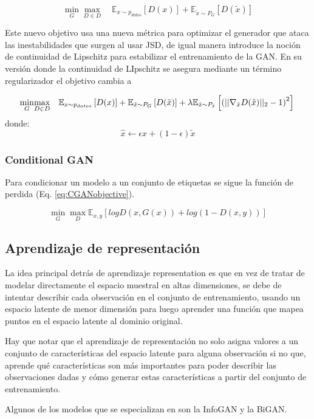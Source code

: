 \begin{equation}
	\label{eq:WGANobjective}
	\underset{G}{\min}\underset{D \in D}{\max}\quad \mathbb{E}_{x \sim  p_{datos}}\left[ D (x) \right] + \mathbb{E}_{\tilde{x}\sim P_{G}}\left[ D(\tilde{x})\right]
\end{equation}

Este nuevo objetivo usa una nueva métrica para optimizar el generador que ataca las inestabilidades que surgen al usar JSD, de igual manera introduce la noción de continuidad de Lipschitz para estabilizar el entrenamiento de la GAN. En su versión donde la continuidad de LIpschitz se asegura mediante un término regularizador el objetivo cambia a

\begin{equation}
	\underset{G}{\min}\underset{D \in D}{\max}\quad \mathbb{E}_{x \sim  p_{datos}}\left[ D (x) \right] + \mathbb{E}_{\tilde{x}\sim P_{G}}\left[ D(\tilde{x})\right] + \lambda \mathbb{E}_{\hat{x}\sim P_{\hat{x}}}\left[ \left( || \nabla_{\hat{x}}D(\hat{x})||_{2} - 1\right) ^2 \right]\\
\end{equation}
\qquad\qquad donde:
\[
	\hat{x} \leftarrow \epsilon x + (1 - \epsilon) \tilde{x}
\]

\subsubsection{Conditional GAN}

Para condicionar un modelo a un conjunto de etiquetas se sigue la función de perdida (Eq. \ref{eq:CGANobjective}).

\begin{equation}
	\label{eq:CGANobjective}
	\underset{G}{\min}\underset{D}{\max} \mathbb{E}_{x,y}\left[ log D (x, G(x)) +  log (1 - D(x,y) ) \right]
\end{equation}

\subsection{Aprendizaje de representación}

La idea principal detrás de aprendizaje representation es que en vez de tratar de modelar directamente el espacio muestral en altas dimensiones, se debe de intentar describir cada observación en el conjunto de entrenamiento,  usando un espacio latente de menor dimensión para luego aprender una función que mapea puntos en el espacio latente al dominio original.

Hay que notar que el aprendizaje de representación no solo asigna valores a un conjunto de características del espacio latente para alguna observación si no que, aprende qué características son más importantes para poder describir las observaciones dadas y cómo generar estas características a partir del conjunto de entrenamiento.

Algunos de los modelos que se especializan en son la InfoGAN y la BiGAN.
